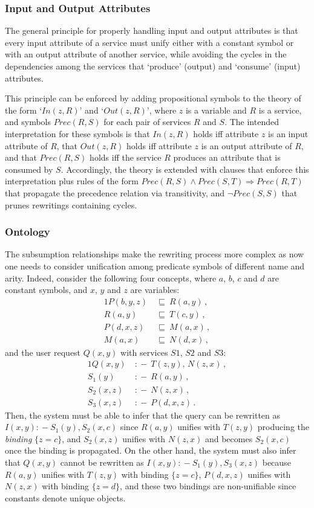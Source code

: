 \documentclass{llncs}
\newcommand{\qrule}{:\!\!-}
\newcommand{\orule}{\sqsubseteq}
\begin{document}
\subsubsection{Input and Output Attributes}

The general principle for properly handling input and output attributes 
is that every input attribute of a service must unify either with a
constant symbol or with an output attribute of another service,
while avoiding the cycles in the dependencies among the services that
`produce' (output) and `consume' (input) attributes.

This principle can be enforced by adding propositional symbols to
the theory of the form `$In(z,R)$' and `$Out(z,R)$', where $z$ is
a variable and $R$ is a service, and symbols $Prec(R,S)$ for each pair
of services $R$ and $S$.
The intended interpretation for these symbols is that $In(z,R)$
holds iff attribute $z$ is an input attribute of $R$, that
$Out(z,R)$ holds iff attribute $z$ is an output attribute of $R$, 
and that $Prec(R,S)$ holds iff the service $R$ produces an attribute
that is consumed by $S$. Accordingly, the theory is extended with
clauses that enforce this interpretation plus rules of the form
$Prec(R,S) \land Prec(S,T)\Rightarrow Prec(R,T)$ that propagate
the precedence relation via transitivity, and $\neg Prec(S,S)$
that prunes rewritings containing cycles.

\subsubsection{Ontology}

The subsumption relationships make the rewriting process more complex
as now one needs to consider unification among predicate symbols of different
name and arity. Indeed, consider the following four concepts, where $a$,
$b$, $c$ and $d$ are constant symbols, and $x$, $y$ and $z$ are variables:
\begin{alignat*}{1}
P(b,y,z)\ &\orule\ R(a,y)\,, \\
R(a,y)\   &\orule\ T(c,y)\,, \\
P(d,x,z)\ &\orule\ M(a,x)\,, \\
M(a,x)\   &\orule\ N(d,x)\,,
\end{alignat*}
and the user request $Q(x,y)$ with services $S1$, $S2$ and $S3$:
\begin{alignat*}{1}
Q(x,y)\   &\qrule\ T(z,y),\,N(z,x)\,, \\
S_1(y)\   &\qrule\ R(a,y)\,, \\
S_2(x,z)\ &\qrule\ N(z,x)\,, \\
S_3(x,z)\ &\qrule\ P(d,x,z)\,.
\end{alignat*}
Then, the system must be able to infer that the query can be 
rewritten as $I(x,y) \qrule S_1(y),S_2(x,c)$ since $R(a,y)$
unifies with $T(z,y)$ producing the \emph{binding} $\{z=c\}$,
and $S_2(x,z)$ unifies with $N(z,x)$ and becomes $S_2(x,c)$
once the binding is propagated.
On the other hand, the system must also infer that $Q(x,y)$
cannot be rewritten as $I(x,y)\qrule S_1(y),S_3(x,z)$ because
$R(a,y)$ unifies with $T(z,y)$ with binding $\{z=c\}$,
$P(d,x,z)$ unifies with $N(z,x)$ with binding $\{z=d\}$,
and these two bindings are non-unifiable since constants
denote unique objects.
\end{document}
